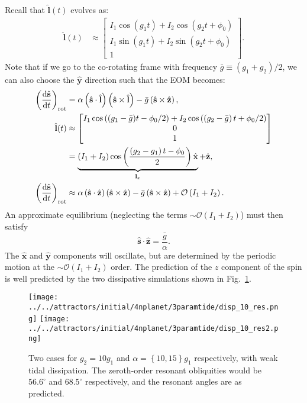 \documentclass[11pt,
        usenames, %
        dvipsnames %
    ]{article}
\newcommand*{\rd}[2]{\frac{\mathrm{d}#1}{\mathrm{d}#2}}
\newcommand*{\bm}[1]{\boldsymbol{\mathbf{#1}}}
\newcommand*{\uv}[1]{\hat{\bm{#1}}}
\newcommand*{\p}[1]{\left(#1\right)}
\newcommand*{\z}[1]{\left\{#1\right\}}
\begin{document}
Recall that $\uv{l}(t)$ evolves as:
\begin{align}
    \uv{l}(t) &\approx \begin{bmatrix}
        I_1 \cos\p{g_1 t} + I_2 \cos\p{g_2 t + \phi_0}\\
        I_1 \sin\p{g_1 t} + I_2 \sin\p{g_2 t + \phi_0}\\
        1
    \end{bmatrix}.
\end{align}
Note that if we go to the co-rotating frame with frequency $\bar{g} \equiv
\p{g_1 + g_2}/2$, we can also choose the $\uv{y}$ direction such that the EOM
becomes:
\begin{align}
    \p{\rd{\uv{s}}{t}}_{\rm rot}
        &= \alpha\p{\uv{s} \cdot \uv{l}}\p{\uv{s} \times \uv{l}}
            - \bar{g}\p{\uv{s} \times \uv{z}},\\
    \uv{l}(t) &\approx \begin{bmatrix}
        I_1 \cos\p{(g_1 - \bar{g}) t
            - \phi_0 / 2} + I_2 \cos\p{\p{g_2 - \bar{g}} t + \phi_0 / 2}\\
        0\\
        1
    \end{bmatrix}\nonumber\\
        &= \underbrace{
            \p{I_1 + I_2} \cos \p{\frac{\p{g_2 - g_1}t - \phi_0}{2}}\uv{x}}
            _{\bm{l}_x} + \uv{z},\\
    \p{\rd{\uv{s}}{t}}_{\rm rot}
        &\approx \alpha \p{\uv{s} \cdot \uv{z}} \p{\uv{s} \times \uv{z}}
            - \bar{g}\p{\uv{s} \times \uv{z}}
            + \mathcal{O}\p{I_1 + I_2}.
\end{align}
An approximate equilibrium (neglecting the terms $\sim \mathcal{O}\p{I_1 +
I_2}$) must then satisfy
\begin{equation}
    \uv{s} \cdot \uv{z} = \frac{\bar{g}}{\alpha}.
\end{equation}
The $\uv{x}$ and $\uv{y}$ components will oscillate, but are determined by the
periodic motion at the $\sim \mathcal{O}\p{I_1 + I_2}$ order. The prediction of
the $z$ component of the spin is well predicted by the two dissipative
simulations shown in Fig.~\ref{fig:new}.
\begin{figure}
    \centering
    \texttt{[image: ../../attractors/initial/4nplanet/3paramtide/disp\_10\_res.png]}
    \texttt{[image: ../../attractors/initial/4nplanet/3paramtide/disp\_10\_res2.png]}
    \caption{Two cases for $g_2 = 10g_1$ and $\alpha = \z{10, 15}g_1$
    respectively, with weak tidal dissipation. The zeroth-order resonant
    obliquities would be $56.6^\circ$ and $68.5^\circ$ respectively, and the
    resonant angles are as predicted.}\label{fig:new}
\end{figure}
\end{document}
